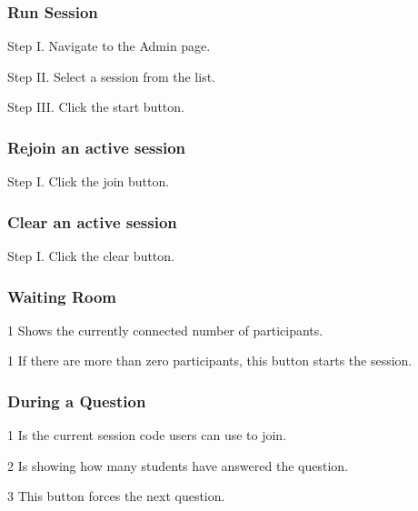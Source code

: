 \subsubsection{Run Session}
\begin{userManualItemlist}
    \item[Step I.] Navigate to the Admin page.
    \item[Step II.] Select a session from the list.
    \item[Step III.] Click the start button.
\end{userManualItemlist}

\subsubsection{Rejoin an active session}
\begin{userManualItemlist}
    \item[Step I.] Click the join button.
\end{userManualItemlist}

\subsubsection{Clear an active session}
\begin{userManualItemlist}
    \item[Step I.] Click the clear button.
\end{userManualItemlist}

\subsubsection{Waiting Room}
\begin{userManualItemlist}
    \item[1] Shows the currently connected number of participants.
    \item[1] If there are more than zero participants, this button starts the session.
\end{userManualItemlist}

\subsubsection{During a Question}
\begin{userManualItemlist}
    \item[1] Is the current session code users can use to join.
    \item[2] Is showing how many students have answered the question.
    \item[3] This button forces the next question.  
\end{userManualItemlist}

